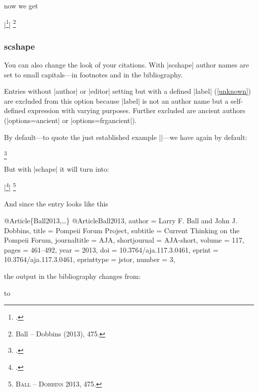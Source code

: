 \documentclass[a4paper,
10pt,
greek,
french,
spanish,
italian,
ngerman,
english
]{ltxdoc}
\begin{document}
now we get

\begin{tcolorbox}[examplebox] 
|\footnote{\cite[475]{Ball2013}.}|
\tcblower
\footnote{Ball – Dobbins {\color{red}(}2013{\color{red})}, 475.}
\end{tcolorbox}


\subsubsection{scshape}\label{scshape}
You can also change the look of your citations. 
With |scshape| author names are set to small capitals---in footnotes and in the bibliography.

Entries without |author| or |editor| setting but with a defined
 |label| (\cref{unknown}) are excluded from this option
because |label| is not an author name but a self-defined expression with varying purposes.
Further excluded are ancient authors (|options={ancient}| or |options={frgancient}|).

By default---to quote the just established example ||---we have again by default:

\begin{example}
\footnote{\cite[475]{Ball2013}.}
\end{example}

But with |schape| it will turn into:

\begin{tcolorbox}[examplebox] 
|\footnote{\cite[475]{Ball2013}.}|
\tcblower
\footnote{{\scshape {\color{red}Ball – Dobbins}} 2013, 475.}
\end{tcolorbox}

And since the entry looks like this

\begin{bibexample}[label=Ball2013]{{@}Article\{Ball2013,…\}}
@Article{Ball2013,
author       = {Larry F. Ball and John J. Dobbins},
title        = {Pompeii Forum Project},
subtitle     = {Current Thinking on the Pompeii Forum},
journaltitle = AJA,
shortjournal = AJA-short,
volume       = {117},
pages        = {461--492},
year         = {2013},
doi          = {10.3764/aja.117.3.0461},
eprint       = {10.3764/aja.117.3.0461},
eprinttype   = {jstor},
number       = {3},
}
\end{bibexample}


the output in the bibliography changes from:


to 
\end{document}
